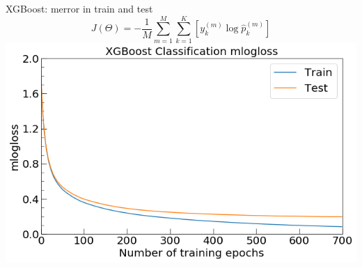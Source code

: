 \documentclass{if-beamer}
\begin{document}
  
\begin{frame}{XGBoost: merror in train and test}    
  \begin{equation} 
J(\Theta)= -\dfrac{1}{M} \sum^M_{m=1} \sum^K_{k=1}\left[ y^{(m)}_k\log \widehat p^{(m)}_k\right]
  \end{equation}
   \centering \includegraphics[scale=0.4]{./figs/xgb_epoch.png}
   
  \end{frame}


  
\end{document}
